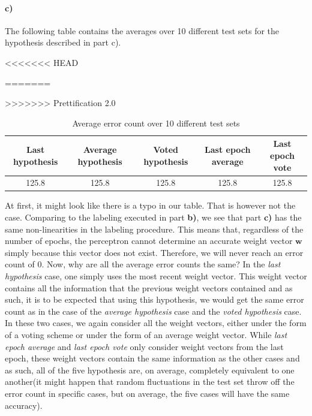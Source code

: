\documentclass{article}
\begin{document}
\begin{table}[H]
\begin{table}[H]
\begin{table}[H]
\begin{table}[H]
\begin{table}[H]
\begin{table}[H]
\paragraph{c)}
The following table contains the averages over 10 different test sets for the hypothesis described in part c).

<<<<<<< HEAD
\begin{table}[H]
=======
\begin{table}[ht]
>>>>>>> Prettification 2.0
    \begin{center}
    \begin{tabular}{c|c|c|c|c}

		Last hypothesis & Average hypothesis & Voted hypothesis & Last epoch average & Last epoch vote \\
	   \hline		125.8 & 125.8 & 125.8 & 125.8 & 125.8
        \end{tabular}\caption{Average error count over 10 different test sets}
    \end{center}
\end{table}

At first, it might look like there is a typo in our table. That is however not the case. Comparing to the labeling executed in part \textbf{b)}, we see that part \textbf{c)} has the same non-linearities in the labeling procedure. This means that, regardless of the number of epochs, the perceptron cannot determine an accurate weight vector $\mathbf{w}$ simply because this vector does not exist. Therefore, we will never reach an error count of 0. Now, why are all the average error counts the same?
In the \textit{last hypothesis} case, one simply uses the most recent weight vector. This weight vector contains all the information that the previous weight vectors contained and as such, it is to be expected that using this hypothesis, we would get the same error count as in the case of the \textit{average hypothesis} case and the \textit{voted hypothesis} case. In these two cases, we again consider all the weight vectors, either under the form of a voting scheme or under the form of an average weight vector. While \textit{last epoch average} and \textit{last epoch vote} only consider weight vectors from the last epoch, these weight vectors contain the same information as the other cases and as such, all of the five hypothesis are, on average, completely equivalent to one another(it might happen that random fluctuations in the test set throw off the error count in specific cases, but on average, the five cases will have the same accuracy).


\end{table}
\end{table}
\end{table}
\end{table}
\end{table}
\end{table}
\end{table}
\end{document}
